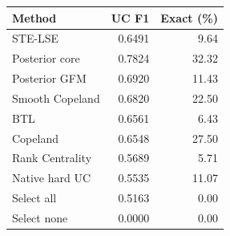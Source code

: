 \begin{tabular}{@{}lrr@{}}
\toprule
Method & UC F1 & Exact (\%)\\
\midrule
STE-LSE & 0.6491 & 9.64\\
Posterior core & 0.7824 & 32.32\\
Posterior GFM & 0.6920 & 11.43\\
Smooth Copeland & 0.6820 & 22.50\\
BTL & 0.6561 & 6.43\\
Copeland & 0.6548 & 27.50\\
Rank Centrality & 0.5689 & 5.71\\
Native hard UC & 0.5535 & 11.07\\
Select all & 0.5163 & 0.00\\
Select none & 0.0000 & 0.00\\
\bottomrule
\end{tabular}
